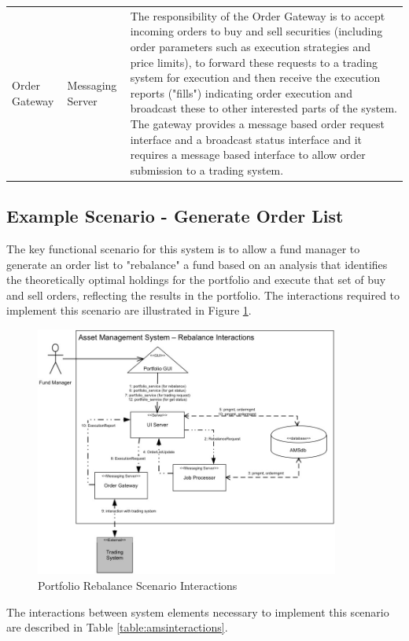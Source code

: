 \begin{table}
\begin{tabular}{l l p{7cm}}
Order Gateway      & Messaging Server & The responsibility of the Order Gateway is to accept incoming orders to buy and sell securities (including order parameters such as execution strategies and price limits), to forward these requests to a trading system for execution and then receive the execution reports ("fills") indicating order execution and broadcast these to other interested parts of the system.  The gateway provides a message based order request interface and a broadcast status interface and it requires a message based interface to allow order submission to a trading system.
\end{tabular}
\end{table}

\subsection{Example Scenario - Generate Order List}

  The key functional scenario for this system is to allow a fund manager to generate an order list to "rebalance" a fund based on an analysis that identifies the theoretically optimal holdings for the portfolio and execute that set of buy and sell orders, reflecting the results in the portfolio.  The interactions required to implement this scenario are illustrated in Figure \ref{figure:rebalanceinteractions}. 

\begin{figure}
\centering
\includegraphics[width=10cm]{Figures/adls-figure5}
\caption{Portfolio Rebalance Scenario Interactions}
\label{figure:rebalanceinteractions}
\end{figure}

The interactions between system elements necessary to implement this scenario are described in Table \ref{table:amsinteractions}. 
  
